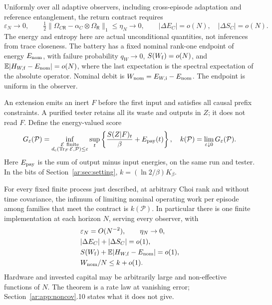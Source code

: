 Uniformly over all adaptive observers, including cross-episode adaptation
and reference entanglement, the return contract requires
\[
 \varepsilon_N\to0,\qquad
 \tfrac12\|\Omega_{C\mathsf R}-\alpha_C\otimes\Omega_{\mathsf R}\|_1
 \le\eta_N\to0,\qquad
 |\Delta E_C|=o(N),\quad|\Delta S_C|=o(N).
\]
The energy and entropy here are actual unconditional quantities, not
inferences from trace closeness. The battery has a fixed nominal rank-one
endpoint of energy \(E_{\rm nom}\), with failure probability \(q_W\to0\),
\(S(W_{\rm f})=o(N)\), and
\(\mathbb E|H_{W,\rm f}-E_{\rm nom}|=o(N)\), where the last expectation is
the spectral expectation of the absolute operator. Nominal debit is
\(W_{\rm nom}=E_{W,\rm i}-E_{\rm nom}\).
The endpoint is uniform in the observer.

An extension emits an inert \(F\) before the first input and satisfies
all causal prefix constraints. A purified tester retains all its waste and
outputs in \(Z\); it does not read \(F\). Define the energy-valued score
\[
 G_\varepsilon(\mathcal P)=\inf_{\substack{\mathcal E\ {\rm finite}\\
 d_{\rm c}(\operatorname{Tr}_F\mathcal E,\mathcal P)\le\varepsilon}}
 \sup_t\left\{\frac{S(Z|F)_t}{\beta}+E_{\rm pay}(t)\right\},\quad
 k(\mathcal P)=\lim_{\varepsilon\downarrow0}G_\varepsilon(\mathcal P).
\]
Here \(E_{\rm pay}\) is the sum of output minus input energies, on the
same run and tester. In the bits of Section~\ref{ar:sec:setting},
\(k=(\ln2/\beta)K_\beta\).

\begin{theorem}\label{ar:thm:noncovapp}
For every fixed finite process just described, at arbitrary Choi rank and
without time covariance, the infimum of limiting nominal operating work
per episode among families that meet the contract is \(k(\mathcal P)\).
In particular there is one finite implementation at each horizon \(N\),
serving every observer, with
\[
 \begin{aligned}
 &\varepsilon_N=O(N^{-2}),\qquad\eta_N\to0,\\
 &|\Delta E_C|+|\Delta S_C|=o(1),\\
 &S(W_{\rm f})+\mathbb E|H_{W,\rm f}-E_{\rm nom}|=o(1),\\
 &W_{\rm nom}/N\le k+o(1).
 \end{aligned}
\]
Hardware and invested capital may be arbitrarily large and non-effective
functions of \(N\). The theorem is a rate law at vanishing error; Section~\ref{ar:app:noncov}.10 states what it does not give.
\end{theorem}

